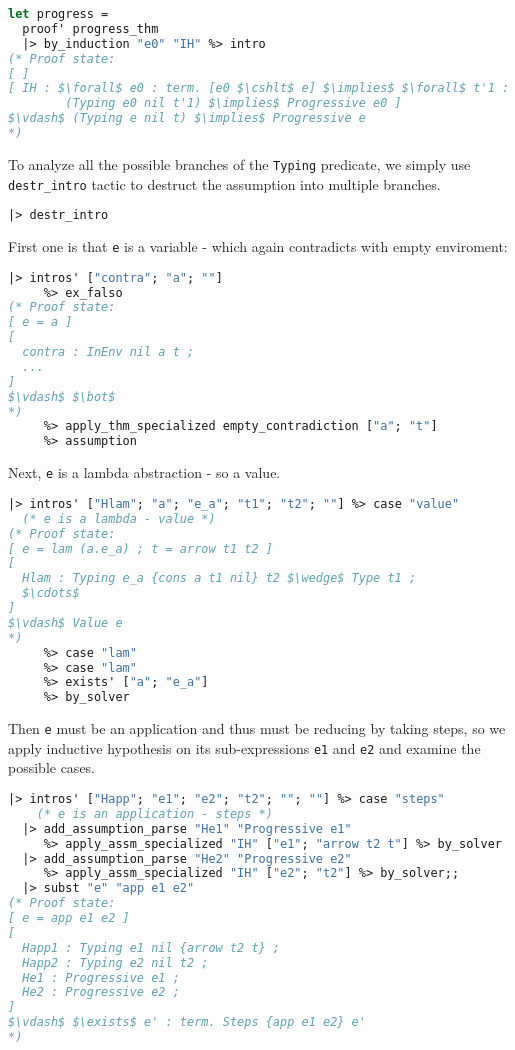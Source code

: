 \documentclass[english, mgr]{iithesis}
\renewcommand{\tt}[1]{\texttt{\small{#1}}}
\begin{document}
\begin{lstlisting}[mathescape, language=OCaml]
let progress =
  proof' progress_thm
  |> by_induction "e0" "IH" %> intro
(* Proof state:
[ ]
[ IH : $\forall$ e0 : term. [e0 $\cshlt$ e] $\implies$ $\forall$ t'1 : term.
        (Typing e0 nil t'1) $\implies$ Progressive e0 ]
$\vdash$ (Typing e nil t) $\implies$ Progressive e
*)
\end{lstlisting}
To analyze all the possible branches of the \tt{Typing} predicate,
we simply use \tt{{destr\_intro}} tactic to destruct the assumption into multiple branches.
\begin{lstlisting}[language=OCaml]
  |> destr_intro
\end{lstlisting}
First one is that \tt{e} is a variable - which again contradicts with empty enviroment:
\begin{lstlisting}[language=OCaml, mathescape]
  |> intros' ["contra"; "a"; ""]
     %> ex_falso
(* Proof state:
[ e = a ]
[
  contra : InEnv nil a t ;
  ...
]
$\vdash$ $\bot$
*)
     %> apply_thm_specialized empty_contradiction ["a"; "t"]
     %> assumption
\end{lstlisting}
Next, \tt{e} is a lambda abstraction - so a value.
\begin{lstlisting}[mathescape, language=OCaml]
  |> intros' ["Hlam"; "a"; "e_a"; "t1"; "t2"; ""] %> case "value"
  (* e is a lambda - value *)
(* Proof state:
[ e = lam (a.e_a) ; t = arrow t1 t2 ]
[
  Hlam : Typing e_a {cons a t1 nil} t2 $\wedge$ Type t1 ;
  $\cdots$
]
$\vdash$ Value e
*)
     %> case "lam"
     %> case "lam"
     %> exists' ["a"; "e_a"]
     %> by_solver
\end{lstlisting}
Then \tt{e} must be an application and thus must be reducing by taking steps,
so we apply inductive hypothesis on its sub-expressions \tt{e1} and \tt{e2}
and examine the possible cases.
\begin{lstlisting}[mathescape,language=OCaml]
  |> intros' ["Happ"; "e1"; "e2"; "t2"; ""; ""] %> case "steps"
    (* e is an application - steps *)
  |> add_assumption_parse "He1" "Progressive e1"
     %> apply_assm_specialized "IH" ["e1"; "arrow t2 t"] %> by_solver
  |> add_assumption_parse "He2" "Progressive e2"
     %> apply_assm_specialized "IH" ["e2"; "t2"] %> by_solver;;
  |> subst "e" "app e1 e2"
(* Proof state:
[ e = app e1 e2 ]
[
  Happ1 : Typing e1 nil {arrow t2 t} ;
  Happ2 : Typing e2 nil t2 ;
  He1 : Progressive e1 ;
  He2 : Progressive e2 ;
]
$\vdash$ $\exists$ e' : term. Steps {app e1 e2} e'
*)
\end{lstlisting}
\end{document}
